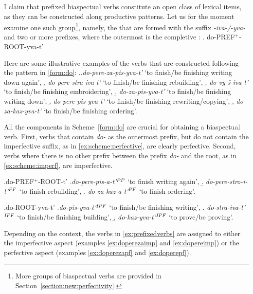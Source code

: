 I claim that prefixed biaspectual verbs constitute an open class of lexical items, as they can be constructed along productive patterns. Let us for the moment examine one such group\footnote{More groups of biaspectual verbs are provided in Section~\ref{section:new:perfectivity}.}, namely, the  that are formed with the suffix \textit{-iva-/-yva-} and two or more prefixes, where the outermost is the completive : 
\ex. \label{form:do}do-PREF$^{+}$-ROOT-yva-t'

Here are some illustrative examples of the verbs that are constructed following the pattern in \ref{form:do}: 
\ex.\label{ex:prefixedverbs}\a.\textit{do-pere-za-pis-yva-t'} `to finish/be finishing writing down again', 
\b. \textit{do-pere-stra-iva-t'} `to finish/be finishing rebuilding',
\b. \textit{do-vy-\v{s}-iva-t'} `to finish/be finishing embroidering',
\b. \textit{do-za-pis-yva-t'} `to finish/be finishing writing down', 
\b. \textit{do-pere-pis-yva-t'} `to finish/be finishing rewriting/copying', 
\b. \textit{do-za-kaz-yva-t'} `to finish/be finishing ordering'.

All the components in Scheme~\ref{form:do} are crucial for obtaining a biaspectual verb. First, verbs that contain \textit{do-} as the outermost prefix, but do not contain the imperfective suffix, as in \ref{ex:scheme:perfective}, are clearly perfective. Second, verbs where there is no other prefix between the prefix \textit{do-} and the root, as in \ref{ex:scheme:imperf}, are imperfective.

\ex.\label{ex:scheme:perfective}do-PREF$^{+}$-ROOT-t'
\a.\textit{do-pere-pis-a-t'}$^{\mathit{PF}}$ `to finish writing again', 
\b. \textit{do-pere-stro-i-t'}$^{\mathit{PF}}$ `to finish rebuilding',
\b. \textit{do-za-kaz-a-t'}$^{\mathit{PF}}$ `to finish ordering'.

\ex.\label{ex:scheme:imperf}do-ROOT-yva-t'
\a.\textit{do-pis-yva-t'}$^{\mathit{IPF}}$ `to finish/be finishing writing', 
\b. \textit{do-stra-iva-t'}$^{\mathit{IPF}}$ `to finish/be finishing building',
\b. \textit{do-kaz-yva-t'}$^{\mathit{IPF}}$ `to prove/be proving'.

Depending on the context, the verbs in \ref{ex:prefixedverbs} are assigned to either the imperfective aspect (examples \ref{ex:doperezaimp} and \ref{ex:dopereimp}) or the perfective aspect (examples \ref{ex:doperezapf} and \ref{ex:doperepf}). 

